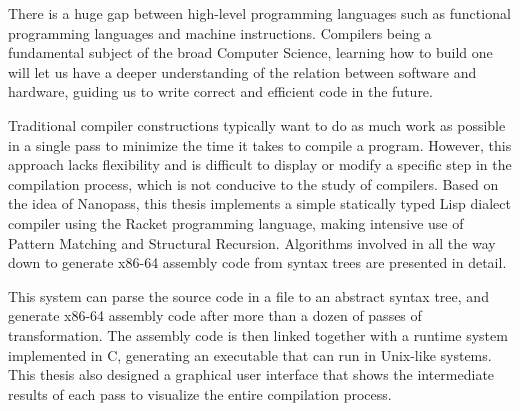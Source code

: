 \begin{abstract*}

\begin{comment}
  This is a sample document of HFUT thesis \LaTeX{} template for bachelor,
  master and doctor. The template is created by \href{https://github.com/LaureatePoet}{LaureatePoet} and \href{https://github.com/HowardZorn}{Fw[a]rd}. The
  template meets the equirements of HFUT thesis writing standards.

  This document will show the usage of basic commands provided by \LaTeX{} and
  some features provided by the template. For more information, please refer to
  the template document hfutthesis-doc.pdf.
\end{comment}

  \noindent %
There is a huge gap between high-level programming languages
such as functional programming languages and machine instructions.
Compilers being a fundamental subject of the broad Computer Science,
learning how to build one will let us have a deeper understanding
of the relation between software and hardware,
guiding us to write correct and efficient code in the future.

Traditional compiler constructions typically want to do
as much work as possible in a single pass to minimize the time
it takes to compile a program. However, this approach lacks flexibility
and is difficult to display or modify a specific step in the
compilation process, which is not conducive to the study of compilers.
Based on the idea of Nanopass, this thesis implements
a simple statically typed Lisp dialect compiler
using the Racket programming language,
making intensive use of Pattern Matching and Structural Recursion.
Algorithms involved in all the way down to generate x86-64 assembly code
from syntax trees are presented in detail.

This system can parse the source code in a file to an abstract syntax tree,
and generate x86-64 assembly code after more than a dozen of passes of transformation.
The assembly code is then linked together with a runtime system implemented in C,
generating an executable that can run in Unix-like systems.
This thesis also designed a graphical user interface that shows
the intermediate results of each pass to visualize the entire compilation process.

\end{abstract*}
